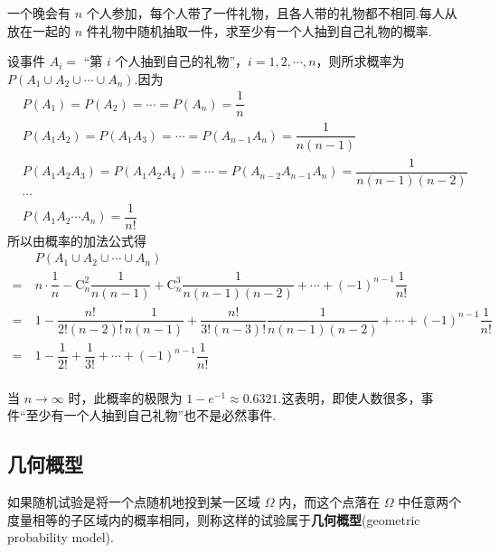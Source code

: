 \begin{example}[][配对问题]
    \indent 一个晚会有 $n$ 个人参加，每个人带了一件礼物，且各人带的礼物都不相同.每人从放在一起的 $n$ 件礼物中随机抽取一件，求至少有一个人抽到自己礼物的概率.
\end{example}

\begin{solution}
    设事件 $A_i=$ “第 $i$ 个人抽到自己的礼物”，$i=1,2,\cdots,n$，则所求概率为 $P(A_1 \cup A_2 \cup \cdots \cup A_n)$.因为
    $$
    \begin{aligned}
        & P(A_1) = P(A_2) = \cdots = P(A_n) = \dfrac{1}{n} \\
        & P(A_1 A_2) = P(A_1 A_3) = \cdots = P(A_{n-1} A_n) = \dfrac{1}{n(n-1)} \\
        & P(A_1 A_2 A_3) = P(A_1 A_2 A_4) = \cdots = P(A_{n-2} A_{n-1} A_n) = \dfrac{1}{n(n-1)(n-2)} \\
        & \cdots \\
        & P(A_1 A_2 \cdots A_n) = \dfrac{1}{n!}
    \end{aligned}
    $$
    所以由概率的加法公式得
    $$
    \begin{aligned}
        & P(A_1 \cup A_2 \cup \cdots \cup A_n) \\
        =\ & n \cdot \dfrac{1}{n} - \mathrm{C}_n^2 \dfrac{1}{n(n-1)} + \mathrm{C}_n^3 \dfrac{1}{n(n-1)(n-2)} + \cdots + (-1)^{n-1} \dfrac{1}{n!} \\
        =\ & 1 - \dfrac{n!}{2! (n-2)!} \dfrac{1}{n(n-1)} + \dfrac{n!}{3! (n-3)!} \dfrac{1}{n(n-1)(n-2)} + \cdots + (-1)^{n-1} \dfrac{1}{n!} \\
        =\ & 1 - \dfrac{1}{2!} + \dfrac{1}{3!} + \cdots + (-1)^{n-1} \dfrac{1}{n!} \\
    \end{aligned}
    $$
\end{solution}

\begin{note}
    \indent 当 $n \to \infty$ 时，此概率的极限为 $1 - e^{-1} \approx 0.6321$.这表明，即使人数很多，事件“至少有一个人抽到自己礼物”也不是必然事件.
\end{note}

\subsection{几何概型}

如果随机试验是将一个点随机地投到某一区域 $\varOmega$ 内，而这个点落在 $\varOmega$ 中任意两个度量相等的子区域内的概率相同，则称这样的试验属于\textbf{几何概型}(geometric probability model).

